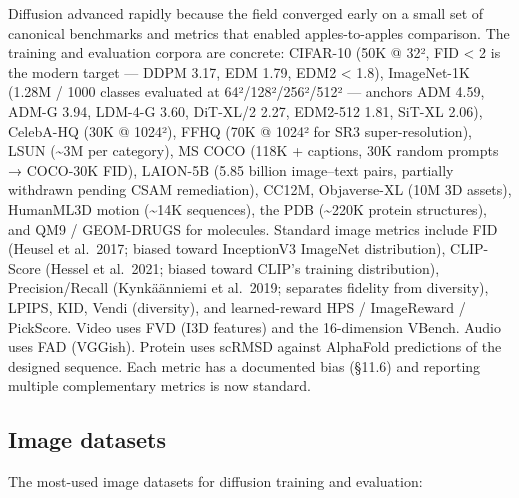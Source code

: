 Diffusion advanced rapidly because the field converged early on a small set of canonical benchmarks and metrics that enabled apples-to-apples comparison. The training and evaluation corpora are concrete: CIFAR-10 (50K @ 32², FID \textless{} 2 is the modern target --- DDPM 3.17, EDM 1.79, EDM2 \textless{} 1.8), ImageNet-1K (1.28M / 1000 classes evaluated at 64²/128²/256²/512² --- anchors ADM 4.59, ADM-G 3.94, LDM-4-G 3.60, DiT-XL/2 2.27, EDM2-512 1.81, SiT-XL 2.06), CelebA-HQ (30K @ 1024²), FFHQ (70K @ 1024² for SR3 super-resolution), LSUN (\textasciitilde3M per category), MS COCO (118K + captions, 30K random prompts → COCO-30K FID), LAION-5B (5.85 billion image--text pairs, partially withdrawn pending CSAM remediation), CC12M, Objaverse-XL (10M 3D assets), HumanML3D motion (\textasciitilde14K sequences), the PDB (\textasciitilde220K protein structures), and QM9 / GEOM-DRUGS for molecules. Standard image metrics include FID (Heusel et al.~2017; biased toward InceptionV3 ImageNet distribution), CLIP-Score (Hessel et al.~2021; biased toward CLIP's training distribution), Precision/Recall (Kynkäänniemi et al.~2019; separates fidelity from diversity), LPIPS, KID, Vendi (diversity), and learned-reward HPS / ImageReward / PickScore. Video uses FVD (I3D features) and the 16-dimension VBench. Audio uses FAD (VGGish). Protein uses scRMSD against AlphaFold predictions of the designed sequence. Each metric has a documented bias (§11.6) and reporting multiple complementary metrics is now standard.

\subsection{Image datasets}\label{image-datasets}

The most-used image datasets for diffusion training and evaluation:

